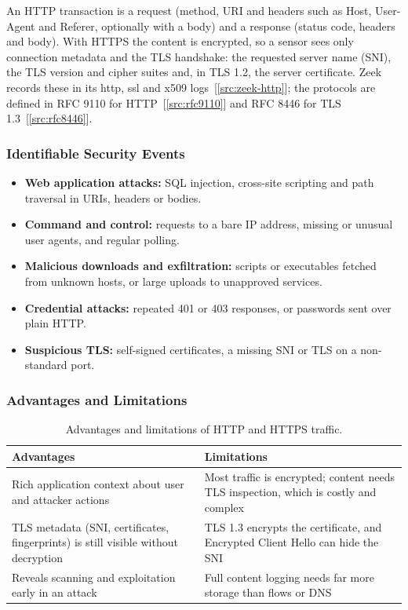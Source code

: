 An HTTP transaction is a request (method, URI and headers such as Host, User-Agent and Referer, optionally with a body) and a response (status code, headers and body). With HTTPS the content is encrypted, so a sensor sees only connection metadata and the TLS handshake: the requested server name (SNI), the TLS version and cipher suites and, in TLS 1.2, the server certificate. Zeek records these in its http, ssl and x509 logs~[\ref{src:zeek-http}]; the protocols are defined in RFC 9110 for HTTP~[\ref{src:rfc9110}] and RFC 8446 for TLS 1.3~[\ref{src:rfc8446}].

\subsubsection{Identifiable Security Events}

\begin{itemize}
  \item \textbf{Web application attacks:} SQL injection, cross-site scripting and path traversal in URIs, headers or bodies.
  \item \textbf{Command and control:} requests to a bare IP address, missing or unusual user agents, and regular polling.
  \item \textbf{Malicious downloads and exfiltration:} scripts or executables fetched from unknown hosts, or large uploads to unapproved services.
  \item \textbf{Credential attacks:} repeated 401 or 403 responses, or passwords sent over plain HTTP.
  \item \textbf{Suspicious TLS:} self-signed certificates, a missing SNI or TLS on a non-standard port.
\end{itemize}

\subsubsection{Advantages and Limitations}

\begin{table}[htbp]
  \centering
  \caption{Advantages and limitations of HTTP and HTTPS traffic.}
  \label{tab:http-pros}
  \begin{tabularx}{\linewidth}{@{}YY@{}}
    \toprule
    \textbf{Advantages} & \textbf{Limitations} \\
    \midrule
    Rich application context about user and attacker actions
      & Most traffic is encrypted; content needs TLS inspection, which is costly and complex \\
    TLS metadata (SNI, certificates, fingerprints) is still visible without decryption
      & TLS 1.3 encrypts the certificate, and Encrypted Client Hello can hide the SNI \\
    Reveals scanning and exploitation early in an attack
      & Full content logging needs far more storage than flows or DNS \\
    \bottomrule
  \end{tabularx}
\end{table}

